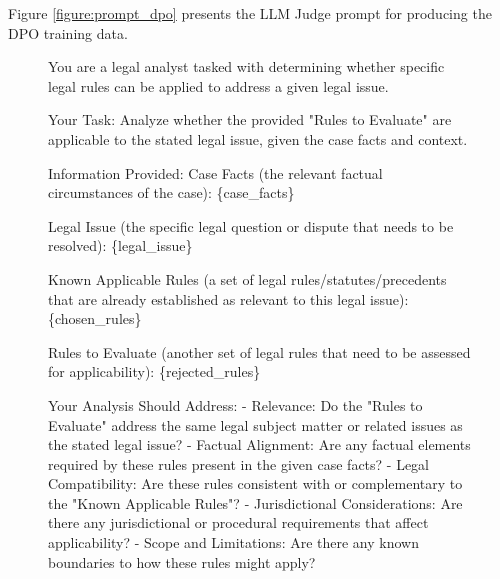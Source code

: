 Figure \ref{figure:prompt_dpo} presents the LLM Judge prompt for producing the DPO training data.
\begin{figure}[htbp]
\begin{tcolorbox}[colback=orange!5!white,colframe=orange!75!black,title=LLM Judge Prompt for Generating the DPO Training Data]

\raggedright

You are a legal analyst tasked with determining whether specific legal rules can be applied to address a given legal issue.\newline

Your Task:\newline
Analyze whether the provided "Rules to Evaluate" are applicable to the stated legal issue, given the case facts and context.\newline

Information Provided:\newline
Case Facts (the relevant factual circumstances of the case):\newline
\{case\_facts\}\newline

Legal Issue (the specific legal question or dispute that needs to be resolved):\newline
\{legal\_issue\}\newline

Known Applicable Rules (a set of legal rules/statutes/precedents that are already established as relevant to this legal issue):\newline
\{chosen\_rules\}\newline

Rules to Evaluate (another set of legal rules that need to be assessed for applicability):\newline
\{rejected\_rules\}\newline

Your Analysis Should Address:\newline
- Relevance: Do the "Rules to Evaluate" address the same legal subject matter or related issues as the stated legal issue?\newline
- Factual Alignment: Are any factual elements required by these rules present in the given case facts?\newline
- Legal Compatibility: Are these rules consistent with or complementary to the "Known Applicable Rules"?\newline
- Jurisdictional Considerations: Are there any jurisdictional or procedural requirements that affect applicability?\newline
- Scope and Limitations: Are there any known boundaries to how these rules might apply?\newline


\end{tcolorbox}
\end{figure}
